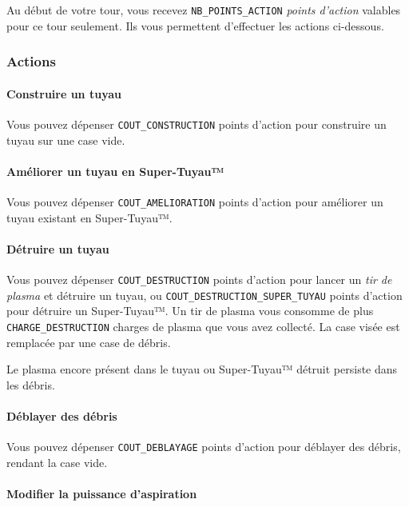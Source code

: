 Au début de votre tour, vous recevez \texttt{NB\_POINTS\_ACTION}
\emph{points d'action} valables pour ce tour seulement. Ils vous
permettent d'effectuer les actions ci-dessous.

\subsubsection{Actions}\label{actions}

\paragraph{Construire un tuyau}\label{construire-un-tuyau}

Vous pouvez dépenser \texttt{COUT\_CONSTRUCTION} points d'action pour
construire un tuyau sur une case vide.

\paragraph{Améliorer un tuyau en
Super-Tuyau™}\label{amuxe9liorer-un-tuyau-en-super-tuyau}

Vous pouvez dépenser \texttt{COUT\_AMELIORATION} points d'action pour
améliorer un tuyau existant en Super-Tuyau™.

\paragraph{Détruire un tuyau}\label{duxe9truire-un-tuyau}

Vous pouvez dépenser \texttt{COUT\_DESTRUCTION} points d'action pour
lancer un \emph{tir de plasma} et détruire un tuyau, ou
\texttt{COUT\_DESTRUCTION\_SUPER\_TUYAU} points d'action pour détruire
un Super-Tuyau™. Un tir de plasma vous consomme de plus
\texttt{CHARGE\_DESTRUCTION} charges de plasma que vous avez collecté.
La case visée est remplacée par une case de débris.

Le plasma encore présent dans le tuyau ou Super-Tuyau™ détruit persiste
dans les débris.

\paragraph{Déblayer des débris}\label{duxe9blayer-des-duxe9bris}

Vous pouvez dépenser \texttt{COUT\_DEBLAYAGE} points d'action pour
déblayer des débris, rendant la case vide.

\paragraph{Modifier la puissance
d'aspiration}\label{modifier-la-puissance-daspiration}

